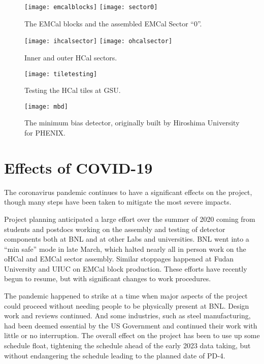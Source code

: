 \begin{figure}[hbt!]
  \centering
  \texttt{[image: emcalblocks]}
  \hfill
  \texttt{[image: sector0]}
  \caption{The EMCal blocks and the assembled EMCal Sector ``0''.}
  \label{fig:emcal}
\end{figure}

\begin{figure}[hbt!]
  \centering
  \texttt{[image: ihcalsector]}
  \hfill
  \texttt{[image: ohcalsector]}
  \caption{Inner and outer HCal sectors.}
  \label{fig:hcal}
\end{figure}

\begin{figure}[hbt!]
  \centering
  \texttt{[image: tiletesting]}
  \caption{Testing the HCal tiles at GSU.}
  \label{fig:tiletesting}
\end{figure}

\begin{figure}[hbt!]
  \centering
  \texttt{[image: mbd]}
  \caption{The minimum bias detector, originally built by Hiroshima
    University for PHENIX.}
  \label{fig:mbd}
\end{figure}

\section{Effects of COVID-19}
\label{sec:covid}

The coronavirus pandemic continues to have a significant effects on the
project, though many steps have been taken to mitigate the most severe
impacts.

Project planning anticipated a large effort over the summer of 2020
coming from students and postdocs working on the assembly and testing
of detector components both at BNL and at other Labs and universities.
BNL went into a ``min safe'' mode in late March, which halted nearly
all in person work on the oHCal and EMCal sector assembly.  Similar
stoppages happened at Fudan University and UIUC on EMCal block
production.  These efforts have recently begun to resume, but with
significant changes to work procedures.

The pandemic happened to strike at a time when major aspects of the
project could proceed without needing people to be physically present
at BNL.  Design work and reviews continued.  And some industries, such
as steel manufacturing, had been deemed essential by the US Government
and continued their work with little or no interruption.  The overall
effect on the project has been to use up some schedule float,
tightening the schedule ahead of the early 2023 data taking, but
without endangering the schedule leading to the planned date of PD-4.



